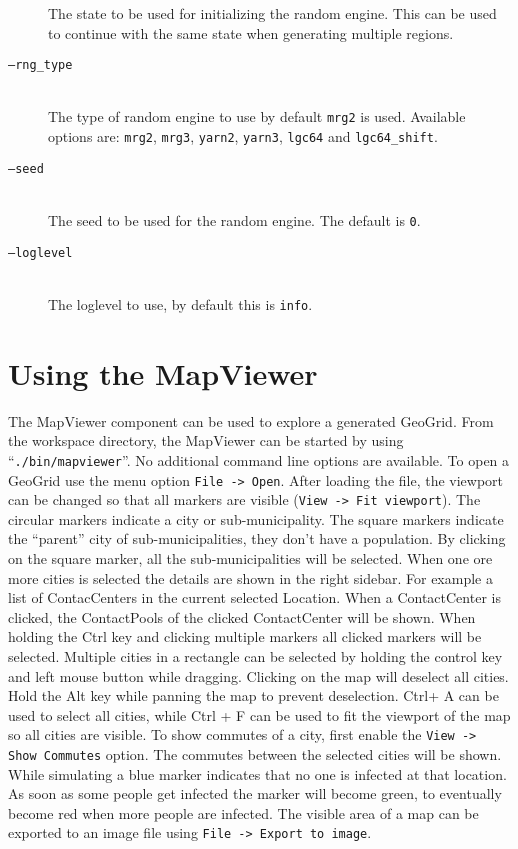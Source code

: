 \begin{description}
        The state to be used for initializing the random engine. This can be used to continue with the same state when generating multiple regions.
    \item[\texttt{--rng\_type}] \ \\
        The type of random engine to use by default \texttt{mrg2} is used. Available options are: \texttt{mrg2}, \texttt{mrg3}, \texttt{yarn2}, \texttt{yarn3}, \texttt{lgc64} and \texttt{lgc64\_shift}.
    \item[\texttt{--seed}] \ \\
        The seed to be used for the random engine. The default is \texttt{0}.
    \item[\texttt{--loglevel}] \ \\
        The loglevel to use, by default this is \texttt{info}.
\end{description}

\section{Using the MapViewer}

The MapViewer component can be used to explore a generated GeoGrid.
From the workspace directory, the MapViewer can be started by using \mbox{``\texttt{./bin/mapviewer}''}. No additional command line options are available.
To open a GeoGrid use the menu option \texttt{File -> Open}. After loading the file, the viewport can be changed so that all markers are visible (\texttt{View -> Fit viewport}).
The circular markers indicate a city or sub-municipality. The square markers indicate the ``parent'' city of sub-municipalities, they don't have a population.
By clicking on the square marker, all the sub-municipalities will be selected.
When one ore more cities is selected the details are shown in the right sidebar. For example a list of ContacCenters in the current selected Location. When a ContactCenter is clicked, the ContactPools of the clicked ContactCenter will be shown.
When holding the Ctrl key and clicking multiple markers all clicked markers will be selected.  Multiple cities in a rectangle can be selected by holding the control key and left mouse button while dragging. Clicking on the map will deselect all cities. Hold the Alt key while panning the map to prevent deselection.
Ctrl+ A can be used to select all cities, while Ctrl + F can be used to fit the viewport of the map so all cities are visible.
To show commutes of a city, first enable the \texttt{View -> Show Commutes} option. The commutes between the selected cities will be shown.
While simulating a blue marker indicates that no one is infected at that location. As soon as some people get infected the marker will become green, to eventually become red when more people are infected.
The visible area of a map can be exported to an image file using \texttt{File -> Export to image}.

